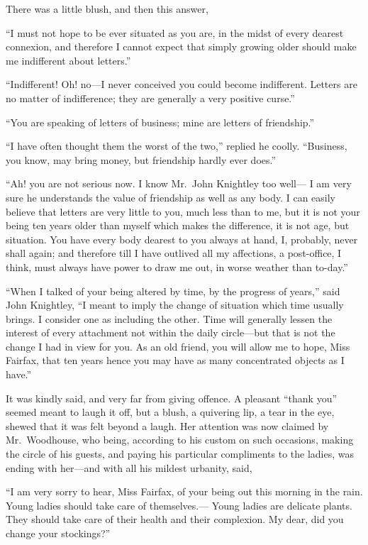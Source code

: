 There was a little blush, and then this answer,

``I must not hope to be ever situated as you are, in the midst of
every dearest connexion, and therefore I cannot expect that simply
growing older should make me indifferent about letters.''

``Indifferent!  Oh! no---I never conceived you could become indifferent.
Letters are no matter of indifference; they are generally a very
positive curse.''

``You are speaking of letters of business; mine are letters
of friendship.''

``I have often thought them the worst of the two,'' replied he coolly.
``Business, you know, may bring money, but friendship hardly
ever does.''

``Ah! you are not serious now.  I know Mr.\ John Knightley too well---%
I am very sure he understands the value of friendship as well as
any body.  I can easily believe that letters are very little to you,
much less than to me, but it is not your being ten years older than
myself which makes the difference, it is not age, but situation.
You have every body dearest to you always at hand, I, probably,
never shall again; and therefore till I have outlived all my affections,
a post-office, I think, must always have power to draw me out,
in worse weather than to-day.''

``When I talked of your being altered by time, by the progress of years,''
said John Knightley, ``I meant to imply the change of situation
which time usually brings.  I consider one as including the other.
Time will generally lessen the interest of every attachment not within
the daily circle---but that is not the change I had in view for you.
As an old friend, you will allow me to hope, Miss Fairfax, that ten
years hence you may have as many concentrated objects as I have.''

It was kindly said, and very far from giving offence.  A pleasant
``thank you'' seemed meant to laugh it off, but a blush, a quivering lip,
a tear in the eye, shewed that it was felt beyond a laugh.
Her attention was now claimed by Mr.\ Woodhouse, who being,
according to his custom on such occasions, making the circle of
his guests, and paying his particular compliments to the ladies,
was ending with her---and with all his mildest urbanity, said,

``I am very sorry to hear, Miss Fairfax, of your being out this
morning in the rain.  Young ladies should take care of themselves.---%
Young ladies are delicate plants.  They should take care of their
health and their complexion.  My dear, did you change your stockings?''

